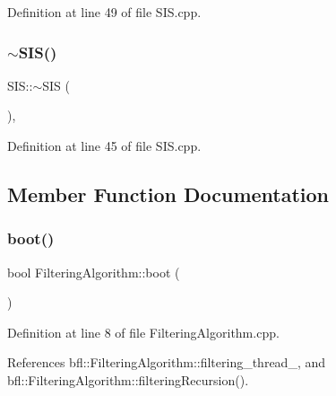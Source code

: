 Definition at line 49 of file S\+I\+S.\+cpp.

\mbox{\label{classbfl_1_1SIS_afe51d2eb915e0813ee4dc804a680566b}} 
\subsubsection{\texorpdfstring{$\sim$\+S\+I\+S()}{~SIS()}}
{\footnotesize\ttfamily S\+I\+S\+::$\sim$\+S\+IS (\begin{DoxyParamCaption}{ }\end{DoxyParamCaption})\hspace{0.3cm}{\ttfamily [virtual]}, {\ttfamily [noexcept]}}



Definition at line 45 of file S\+I\+S.\+cpp.



\subsection{Member Function Documentation}
\mbox{\label{classbfl_1_1FilteringAlgorithm_a96651f8464190c0a56d79219a1017147}} 
\subsubsection{\texorpdfstring{boot()}{boot()}}
{\footnotesize\ttfamily bool Filtering\+Algorithm\+::boot (\begin{DoxyParamCaption}{ }\end{DoxyParamCaption})\hspace{0.3cm}{\ttfamily [inherited]}}



Definition at line 8 of file Filtering\+Algorithm.\+cpp.



References bfl\+::\+Filtering\+Algorithm\+::filtering\+\_\+thread\+\_\+, and bfl\+::\+Filtering\+Algorithm\+::filtering\+Recursion().

